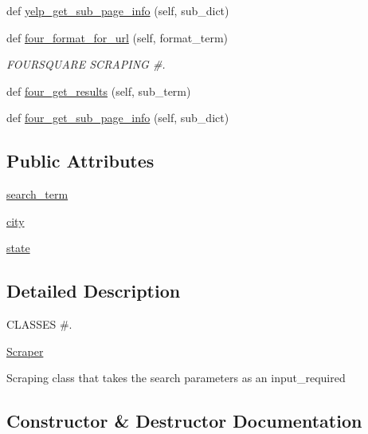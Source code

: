 \begin{DoxyCompactItemize}
\item 
def \mbox{\hyperlink{classserver_1_1_scraper_1_1scrape_1_1_scraper_abbca4337e44d3989ac1cfd74cc77f65d}{yelp\+\_\+get\+\_\+sub\+\_\+page\+\_\+info}} (self, sub\+\_\+dict)
\item 
def \mbox{\hyperlink{classserver_1_1_scraper_1_1scrape_1_1_scraper_ab2dba9f86fe3bbf393833f1c3ddf19d8}{four\+\_\+format\+\_\+for\+\_\+url}} (self, format\+\_\+term)
\begin{DoxyCompactList}\small\item\em F\+O\+U\+R\+S\+Q\+U\+A\+RE S\+C\+R\+A\+P\+I\+NG \#. \end{DoxyCompactList}\item 
def \mbox{\hyperlink{classserver_1_1_scraper_1_1scrape_1_1_scraper_a783cc9e70f79b362d03b9d93d1d587ef}{four\+\_\+get\+\_\+results}} (self, sub\+\_\+term)
\item 
def \mbox{\hyperlink{classserver_1_1_scraper_1_1scrape_1_1_scraper_a1145a663a9763ba00b24b784381fa1df}{four\+\_\+get\+\_\+sub\+\_\+page\+\_\+info}} (self, sub\+\_\+dict)
\end{DoxyCompactItemize}
\subsection*{Public Attributes}
\begin{DoxyCompactItemize}
\item 
\mbox{\hyperlink{classserver_1_1_scraper_1_1scrape_1_1_scraper_aafe46c1aad2b3e1a17bfbfe5ff76eee0}{search\+\_\+term}}
\item 
\mbox{\hyperlink{classserver_1_1_scraper_1_1scrape_1_1_scraper_a949d360a3dba9a89d3b6e449b01ea713}{city}}
\item 
\mbox{\hyperlink{classserver_1_1_scraper_1_1scrape_1_1_scraper_aa661980e9576885bf5a4d3f2193978bd}{state}}
\end{DoxyCompactItemize}


\subsection{Detailed Description}
C\+L\+A\+S\+S\+ES \#. 

\mbox{\hyperlink{classserver_1_1_scraper_1_1scrape_1_1_scraper}{Scraper}}

Scraping class that takes the search parameters as an input\+\_\+required 

\subsection{Constructor \& Destructor Documentation}
\mbox{\label{classserver_1_1_scraper_1_1scrape_1_1_scraper_a95f25aa269db339cee574652685b4ec3}} 
